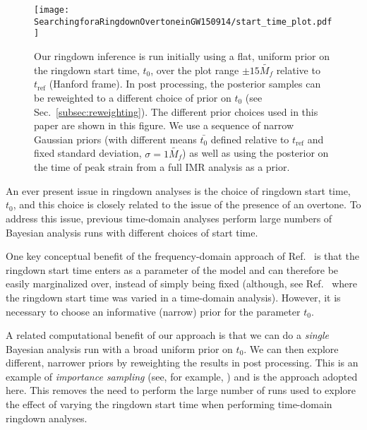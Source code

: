 \begin{figure}[t]
	\texttt{[image: SearchingforaRingdownOvertoneinGW150914/start\_time\_plot.pdf]}
	\caption[Different prior choices for the ringdown start time used for the GW150914 analysis]{ 
		Our ringdown inference is run initially using a flat, uniform prior on the ringdown start time, $t_0$, over the plot range $\pm 15 \tilde{M_f}$ relative to $t_\mathrm{ref}$ (Hanford frame).
		In post processing, the posterior samples can be reweighted to a different choice of prior on $t_0$ (see Sec.~\ref{subsec:reweighting}). 
		The different prior choices used in this paper are shown in this figure. 
		We use a sequence of narrow Gaussian priors (with different means $\bar{t_0}$ defined relative to $t_\mathrm{ref}$ and fixed standard deviation, $\sigma=1\tilde{M_f}$) as well as using the posterior on the time of peak strain from a full IMR analysis as a prior.
	}
	\label{fig:start_time}
\end{figure}

An ever present issue in ringdown analyses is the choice of ringdown start time, $t_0$, and this choice is closely related to the issue of the presence of an overtone.
To address this issue, previous time-domain analyses \cite{Isi:2019aib, Cotesta:2022pci, Isi:2022mhy} perform large numbers of Bayesian analysis runs with different choices of start time.

One key conceptual benefit of the frequency-domain approach of Ref.~\cite{Finch:2021qph} is that the ringdown start time enters as a parameter of the model and can therefore be easily marginalized over, instead of simply being fixed (although, see Ref.~\cite{Carullo:2019flw} where the ringdown start time was varied in a time-domain analysis). 
However, it is necessary to choose an informative (narrow) prior for the parameter $t_0$.

A related computational benefit of our approach is that we can do a \emph{single} Bayesian analysis run with a broad uniform prior on $t_0$. We can then explore different, narrower priors by reweighting the results in post processing. 
This is an example of \emph{importance sampling} (see, for example, \cite{RobertChristian2013MCsm}) and is the approach adopted here.
This removes the need to perform the large number of runs used to explore the effect of varying the ringdown start time when performing time-domain ringdown analyses.

